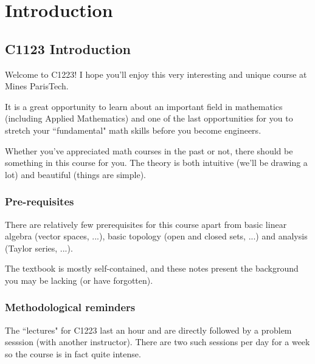 \section*{Introduction}
\subsection{C1123 Introduction}
Welcome to C1223! I hope you'll enjoy this very interesting and unique course at Mines ParisTech.

It is a great opportunity to learn about an important field in mathematics (including Applied Mathematics) and one of the last opportunities for you to stretch your ``fundamental" math skills before you become engineers.

Whether you've appreciated math courses in the past or not, there should be something in this course for you. The theory is both intuitive (we'll be drawing a lot) and beautiful (things are simple).

\subsubsection{Pre-requisites}
There are relatively few prerequisites for this course apart from basic linear algebra (vector spaces, ...), basic topology (open and closed sets, ...) and analysis (Taylor series, ...).

The textbook is mostly self-contained, and these notes present the background you may be lacking (or have forgotten).

\subsubsection{Methodological reminders}
The ``lectures" for C1223 last an hour and are directly followed by a problem sesssion (with another instructor). There are two such sessions per day for a week so the course is in fact quite intense.

